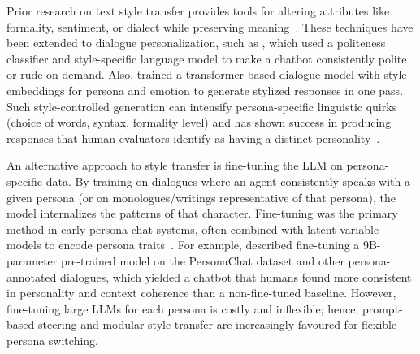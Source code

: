 Prior research on text style transfer provides tools for altering attributes like formality, sentiment, or dialect while preserving meaning~\cite{niu-bansal-2018-polite, sudhakar-etal-2019-transforming}. These techniques have been extended to dialogue personalization, such as \citet{niu-bansal-2018-polite}, which used a politeness classifier and style-specific language model to make a chatbot consistently polite or rude on demand. Also, \citet{zhang-etal-2018-personalizing} trained a transformer-based dialogue model with style embeddings for persona and emotion to generate stylized responses in one pass. Such style-controlled generation can intensify persona-specific linguistic quirks (choice of words, syntax, formality level) and has shown success in producing responses that human evaluators identify as having a distinct personality~\cite{zhang-etal-2018-personalizing}.

An alternative approach to style transfer is fine-tuning the LLM on persona-specific data. By training on dialogues where an agent consistently speaks with a given persona (or on monologues/writings representative of that persona), the model internalizes the patterns of that character. Fine-tuning was the primary method in early persona-chat systems, often combined with latent variable models to encode persona traits~\cite{li-etal-2016-persona}. For example, \citet{roller-etal-2021-recipes} described fine-tuning a 9B-parameter pre-trained model on the PersonaChat dataset and other persona-annotated dialogues, which yielded a chatbot that humans found more consistent in personality and context coherence than a non-fine-tuned baseline. However, fine-tuning large LLMs for each persona is costly and inflexible; hence, prompt-based steering and modular style transfer are increasingly favoured for flexible persona switching.


